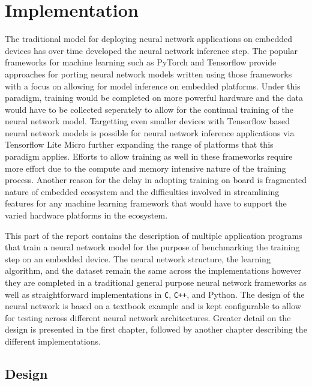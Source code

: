 \part{Implementation}

The traditional model for deploying neural network applications on embedded devices has over time developed the neural network inference step. The popular frameworks for machine learning such as PyTorch and Tensorflow provide approaches for porting neural network models written using those frameworks with a focus on allowing for model inference on embedded platforms. Under this paradigm, training would be completed on more powerful hardware and the data would have to be collected seperately to allow for the continual training of the neural network model. Targetting even smaller devices with Tensorflow based neural network models is possible for neural network inference applications via Tensorflow Lite Micro \cite{tflm} further expanding the range of platforms that this paradigm applies. Efforts to allow training as well in these frameworks require more effort due to the compute and memory intensive nature of the training process. Another reason for the delay in adopting training on board is fragmented nature of embedded ecosystem and the difficulties involved in streamlining features for any machine learning framework that would have to support the varied hardware platforms in the ecosystem.

This part of the report contains the description of multiple application programs that train a neural network model for the purpose of benchmarking the training step on an embedded device. The neural network structure, the learning algorithm, and the dataset remain the same across the implementations however they are completed in a traditional general purpose neural network frameworks as well as straightforward implementations in \texttt{C}, \texttt{C++}, and Python. The design of the neural network is based on a textbook example and is kept configurable to allow for testing across different neural network architectures. Greater detail on the design is presented in the first chapter, followed by another chapter describing the different implementations.


\chapter{Design}

